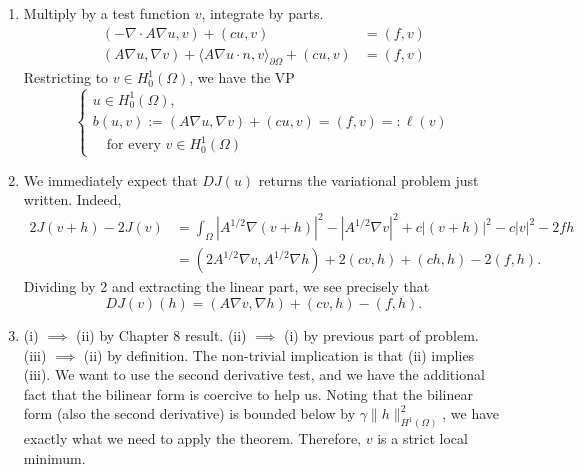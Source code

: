 \documentclass[letterpaper,twoside,11pt]{article}
\theoremstyle{mystyle}
\newcommand{\cblu}{\color{blue}}
\newcommand{\Hone}{H^1\left( \Omega \right)}
\begin{document}
\cblu 
\begin{enumerate}
  \item Multiply by a test function $v$, integrate by parts. 
  \begin{align*}
    \left( -\nabla \cdot A\nabla u, v \right) + \left( cu,v \right) &= \left( f, v \right) \\[.2cm]
    \left( A\nabla u, \nabla v \right) + \langle A\nabla u \cdot n, v\rangle_{\partial \Omega} + \left( cu,v \right) &= \left( f, v \right) 
  \end{align*}
  Restricting to $v \in H_0^1 \left( \Omega \right)$, we have the VP 
  \[\left\{ {\begin{array}{*{20}{l}}
    u \in H_0^1 \left( \Omega \right), \\[.2cm]
    b(u,v) := \left( A\nabla u, \nabla v \right) + (cu,v) = \left( f, v \right) =: \ell (v) \\[.2cm]
    \quad \text{for every } v \in H_0^1 (\Omega)
  \end{array}} \right.\] 
  \item We immediately expect that $DJ(u)$ returns the variational problem just written. Indeed, 
  \begin{align*}
    2J(v + h) - 2J(v) &= \int_\Omega |A^{1/2} \nabla \left( v+h \right)|^2-|A^{1/2} \nabla v|^2 + c|\left( v+h \right)|^2 -c|v|^2 - 2f h\\ 
    &= \left( 2A^{1/2}\nabla v, A^{1/2}\nabla h \right) +2(cv, h) + (ch,h) - 2(f, h).
  \end{align*}
  Dividing by 2 and extracting the linear part, we see precisely that 
  \[DJ(v)(h) = \left( A\nabla v, \nabla h \right) + (cv, h) - \left( f, h \right).\]
  \item (i) $\implies$ (ii) by Chapter 8 result. (ii) $\implies$ (i) by previous part of problem. (iii) \(\implies\) (ii) by definition. The non-trivial implication is that (ii) implies (iii). We want to use the second derivative test, and we have the additional fact that the bilinear form is coercive to help us. Noting that the bilinear form (also the second derivative) is bounded below by $\gamma \|h\|^2_{\Hone}$, we have exactly what we need to apply the theorem. Therefore, $v$ is a strict local minimum. 
\end{enumerate}
\end{document}
